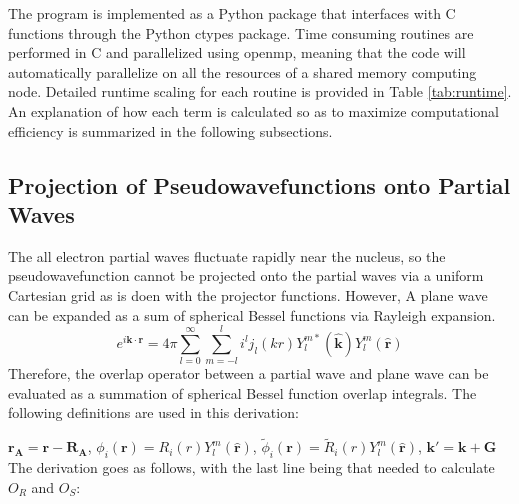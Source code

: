 \documentclass[12pt]{article}
\begin{document}
The program is implemented as a Python package that interfaces with C functions through
the Python ctypes package. Time consuming routines are performed in C and parallelized
using openmp, meaning that the code will automatically parallelize on all the resources
of a shared memory computing node. Detailed runtime scaling for each routine is
provided in Table \ref{tab:runtime}. An explanation of how each term is calculated
so as to maximize computational efficiency is summarized in the following subsections.

\subsection{Projection of Pseudowavefunctions onto Partial Waves}

The all electron partial waves fluctuate rapidly near the nucleus,
so the pseudowavefunction cannot be projected onto the partial waves
via a uniform Cartesian grid as is doen with the projector functions.
However, A plane wave can be expanded as a sum of spherical
Bessel functions via Rayleigh expansion.
\begin{equation}
e^{i\mathbf{k} \cdot \mathbf{r}} = 4\pi \sum_{l=0}^{\infty}\sum_{m=-l}^{l}
i^l j_l(kr)Y_l^{m*}(\mathbf{\hat{k}})Y_l^m(\mathbf{\hat{r}})
\label{eq:pwexp}
\end{equation}
Therefore, the overlap operator between a partial wave and plane wave can be evaluated as a summation
of spherical Bessel function overlap integrals. The following definitions are
used in this derivation:

$\mathbf{r_A} = \mathbf{r} - \mathbf{R_A}$, $\phi_i(\mathbf{r})=R_i(r)Y_l^m(\mathbf{\hat{r}})$,
$\widetilde{\phi}_i(\mathbf{r})=\widetilde{R}_i(r)Y_l^m(\mathbf{\hat{r}})$,
$\mathbf{k'}=\mathbf{k}+\mathbf{G}$\\
The derivation goes as follows, with the last line being that needed to 
calculate $O_R$ and $O_S$:
\end{document}
